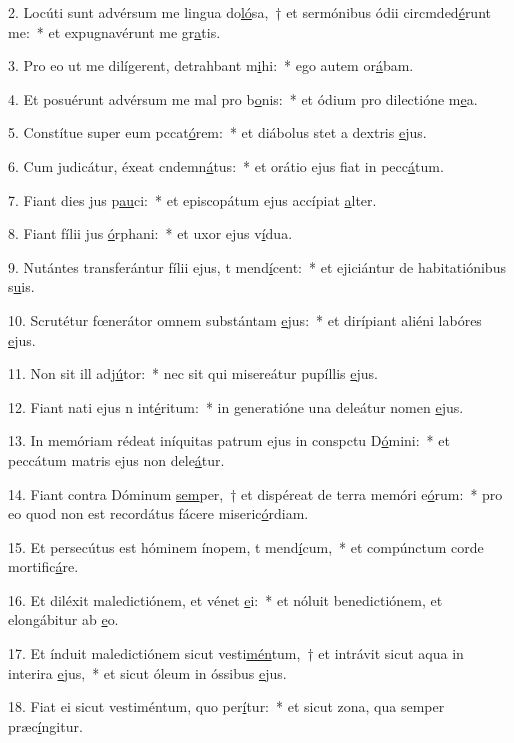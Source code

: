 2. Locúti sunt advérsum me lingua do\uline{ló}sa,~† et sermónibus ódii circmded\uline{é}runt me:~* et expugnavérunt me gr\uline{a}tis.\par 
3. Pro eo ut me dilígerent, detrahbant m\uline{i}hi:~* ego autem or\uline{á}bam.\par 
4. Et posuérunt advérsum me mal pro b\uline{o}nis:~* et ódium pro dilectióne m\uline{e}a.\par 
5. Constítue super eum pccat\uline{ó}rem:~* et diábolus stet a dextris \uline{e}jus.\par 
6. Cum judicátur, éxeat cndemn\uline{á}tus:~* et orátio ejus fiat in pecc\uline{á}tum.\par 
7. Fiant dies jus p\uline{au}ci:~* et episcopátum ejus accípiat \uline{a}lter.\par 
8. Fiant fílii jus \uline{ó}rphani:~* et uxor ejus v\uline{í}dua.\par 
9. Nutántes transferántur fílii ejus, t mend\uline{í}cent:~* et ejiciántur de habitatiónibus s\uline{u}is.\par 
10. Scrutétur fœnerátor omnem substántam \uline{e}jus:~* et dirípiant aliéni labóres \uline{e}jus.\par 
11. Non sit ill adj\uline{ú}tor:~* nec sit qui misereátur pupíllis \uline{e}jus.\par 
12. Fiant nati ejus n int\uline{é}ritum:~* in generatióne una deleátur nomen \uline{e}jus.\par 
13. In memóriam rédeat iníquitas patrum ejus in conspctu D\uline{ó}mini:~* et peccátum matris ejus non dele\uline{á}tur.\par 
14. Fiant contra Dóminum \uline{sem}per,~† et dispéreat de terra memóri e\uline{ó}rum:~* pro eo quod non est recordátus fácere miseric\uline{ó}rdiam.\par 
15. Et persecútus est hóminem ínopem, t mend\uline{í}cum,~* et compúnctum corde mortific\uline{á}re.\par 
16. Et diléxit maledictiónem, et vénet \uline{e}i:~* et nóluit benedictiónem, et elongábitur ab \uline{e}o.\par 
17. Et índuit maledictiónem sicut vesti\uline{mén}tum,~† et intrávit sicut aqua in interira \uline{e}jus,~* et sicut óleum in óssibus \uline{e}jus.\par 
18. Fiat ei sicut vestiméntum, quo per\uline{í}tur:~* et sicut zona, qua semper præc\uline{í}ngitur.\par 
